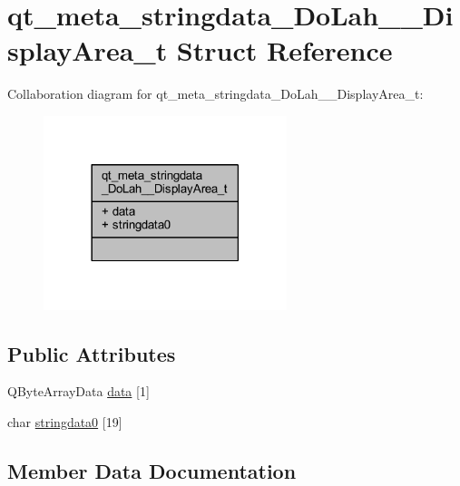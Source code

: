 \hypertarget{structqt__meta__stringdata___do_lah_____display_area__t}{}\section{qt\+\_\+meta\+\_\+stringdata\+\_\+\+Do\+Lah\+\_\+\+\_\+\+Display\+Area\+\_\+t Struct Reference}
\label{structqt__meta__stringdata___do_lah_____display_area__t}


Collaboration diagram for qt\+\_\+meta\+\_\+stringdata\+\_\+\+Do\+Lah\+\_\+\+\_\+\+Display\+Area\+\_\+t\+:\nopagebreak
\begin{figure}[H]
\begin{center}
\leavevmode
\includegraphics[width=201pt]{structqt__meta__stringdata___do_lah_____display_area__t__coll__graph}
\end{center}
\end{figure}
\subsection*{Public Attributes}
\begin{DoxyCompactItemize}
\item 
Q\+Byte\+Array\+Data \hyperlink{structqt__meta__stringdata___do_lah_____display_area__t_a721555be9761a34f6cdfb7cc0f5091f8}{data} \mbox{[}1\mbox{]}
\item 
char \hyperlink{structqt__meta__stringdata___do_lah_____display_area__t_af97b5f16cd66184e2d951a650e708baa}{stringdata0} \mbox{[}19\mbox{]}
\end{DoxyCompactItemize}


\subsection{Member Data Documentation}
\hypertarget{structqt__meta__stringdata___do_lah_____display_area__t_a721555be9761a34f6cdfb7cc0f5091f8}{}
